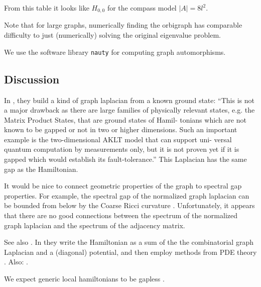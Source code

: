 From this table it looks like $H_{0,0}$ for the compass model $|A| = 8l^2.$

Note that for large graphs, numerically finding the orbigraph has comparable
difficulty to just (numerically) solving the original eigenvalue problem.

We use the software library {\tt nauty}\cite{McKay2014} for computing graph automorphisms.


%
%


\subsection{Discussion}

In \cite{AlShimary2010}, they 
build a kind of graph laplacian from a known ground state:
``This is not a major drawback as there
are large families of physically relevant states, e.g. the
Matrix Product States, that are ground states of Hamil-
tonians which are not known to be gapped or not in two
or higher dimensions. Such an important example is
the two-dimensional AKLT model that can support uni-
versal quantum computation by measurements only, but
it is not proven yet if it is gapped which would establish
its fault-tolerance.''
This Laplacian has the same gap as the Hamiltonian.

It would be nice to connect geometric properties of the
graph to spectral gap properties. For example, the spectral gap of
the normalized graph laplacian can be bounded from below
by the Coarse Ricci curvature \cite{Lin2011}. 
Unfortunately, it appears
that there are no good connections between the spectrum
of the normalized graph laplacian and the spectrum of the adjacency matrix.

See also \cite{Jarret2014,Jarret2015}. 
In \cite{Jarret2015modulus} they
write the Hamiltonian as a sum of the
the combinatorial graph Laplacian and a (diagonal) potential, 
and then employ methods from PDE theory \cite{Andrews2011}.
Also: \cite{Baume2016}. %

We expect generic local hamiltonians to be gapless \cite{Movassagh2016}.

%
%

